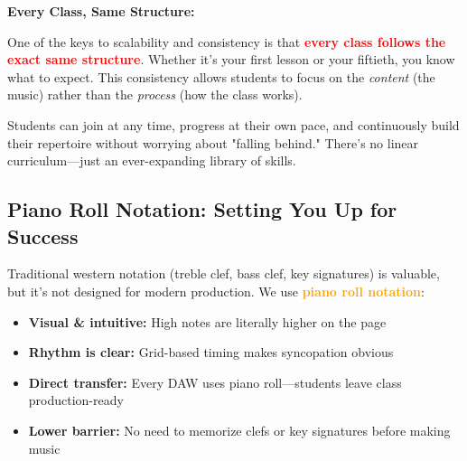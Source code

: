 \documentclass[11pt,letterpaper]{article}
\newcommand{\redtext}[1]{\textcolor{red}{\textbf{#1}}}
\newcommand{\orangetext}[1]{\textcolor{orange}{\textbf{#1}}}
\begin{document}
\textbf{Every Class, Same Structure:}

One of the keys to scalability and consistency is that \redtext{every class follows the exact same structure}. Whether it's your first lesson or your fiftieth, you know what to expect. This consistency allows students to focus on the \textit{content} (the music) rather than the \textit{process} (how the class works). 

Students can join at any time, progress at their own pace, and continuously build their repertoire without worrying about "falling behind." There's no linear curriculum—just an ever-expanding library of skills.

\subsection*{Piano Roll Notation: Setting You Up for Success}

Traditional western notation (treble clef, bass clef, key signatures) is valuable, but it's not designed for modern production. We use \orangetext{piano roll notation}:

\begin{center}
\end{center}

\begin{itemize}[leftmargin=*]
\item \textbf{Visual \& intuitive:} High notes are literally higher on the page
\item \textbf{Rhythm is clear:} Grid-based timing makes syncopation obvious
\item \textbf{Direct transfer:} Every DAW uses piano roll—students leave class production-ready
\item \textbf{Lower barrier:} No need to memorize clefs or key signatures before making music
\end{itemize}
\end{document}
